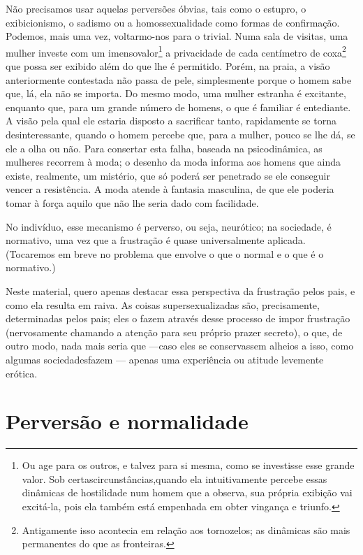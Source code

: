 Não precisamos usar aquelas perversões óbvias, tais como o estupro,
o exibicionismo, o sadismo ou a homossexualidade como formas de
confirmação. Podemos, mais uma vez, voltarmo-nos para o trivial. Numa
sala de visitas, uma mulher investe com um imenso\idxvoysad[|)] valor\footnote{ Ou
age para os outros, e talvez para si mesma, como se investisse esse
grande valor. Sob certas\idxsadivoye[|nn] circunstâncias,\idxvoysad[|nn] quando ela intuitivamente
percebe essas dinâmicas de hostilidade num homem que a observa, sua
própria exibição vai excitá-la, pois ela também está empenhada em obter
vingança e triunfo.} a privacidade de cada centímetro de coxa\footnote{ Antigamente
isso acontecia em relação aos tornozelos; as
dinâmicas são mais permanentes do que as fronteiras.} que
possa ser exibido além do que lhe é permitido. Porém, na praia, a visão
anteriormente contestada não passa de pele, simplesmente porque o homem
sabe que, lá, ela não se importa. Do mesmo modo, uma mulher estranha é
excitante, enquanto que, para um grande número de homens, o que é
familiar é entediante. A visão pela qual ele estaria disposto a
sacrificar tanto, rapidamente se torna desinteressante, quando o homem
percebe que, para a mulher,\idxsexuo{} pouco se lhe dá, se ele a olha ou não. Para
consertar esta falha, baseada na psicodinâmica, as mulheres recorrem à
moda; o desenho da moda informa aos homens que ainda existe, realmente,
um mistério, que só poderá ser penetrado se ele conseguir vencer a
resistência. A moda atende à fantasia masculina,\idxinfanolhar{} de que ele poderia
tomar à força aquilo\idxmistolh{} que não lhe seria dado com facilidade.

No indivíduo, esse mecanismo é perverso, ou seja, neurótico; na
sociedade, é normativo, uma vez que a frustração é quase universalmente
aplicada. (Tocaremos em breve no problema que envolve o que o normal e
o que é o normativo.)

Neste material, quero apenas destacar essa perspectiva da frustração
pelos pais, e como ela resulta em raiva. As coisas\idxroup{} supersexualizadas
são, precisamente, determinadas pelos pais; eles o fazem através desse
processo de impor frustração (nervosamente chamando a atenção para seu
próprio prazer secreto), o que, de outro modo, nada mais seria que ---\idxsexuamis[|)]
caso eles se conservassem alheios a isso, como algumas sociedades\idxpervmiste[|)]
fazem --- apenas uma experiência ou atitude levemente erótica.



\section{Perversão e normalidade}

